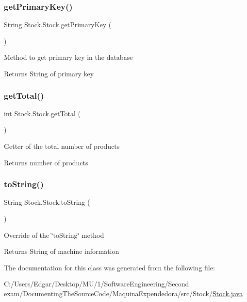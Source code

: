 \subsubsection{\texorpdfstring{get\+Primary\+Key()}{getPrimaryKey()}}
{\footnotesize\ttfamily String Stock.\+Stock.\+get\+Primary\+Key (\begin{DoxyParamCaption}{ }\end{DoxyParamCaption})\hspace{0.3cm}{\ttfamily [inline]}}

Method to get primary key in the database

\begin{DoxyReturn}{Returns}
String of primary key 
\end{DoxyReturn}
\mbox{\label{class_stock_1_1_stock_ad8b5a5604a4421296ab62e8e54817fdd}} 
\subsubsection{\texorpdfstring{get\+Total()}{getTotal()}}
{\footnotesize\ttfamily int Stock.\+Stock.\+get\+Total (\begin{DoxyParamCaption}{ }\end{DoxyParamCaption})\hspace{0.3cm}{\ttfamily [inline]}}

Getter of the total number of products

\begin{DoxyReturn}{Returns}
number of products 
\end{DoxyReturn}
\mbox{\label{class_stock_1_1_stock_a19aa572f66461240db89edf002bec36e}} 
\subsubsection{\texorpdfstring{to\+String()}{toString()}}
{\footnotesize\ttfamily String Stock.\+Stock.\+to\+String (\begin{DoxyParamCaption}{ }\end{DoxyParamCaption})\hspace{0.3cm}{\ttfamily [inline]}}

Override of the \char`\"{}to\+String\char`\"{} method \begin{DoxyReturn}{Returns}
String of machine information 
\end{DoxyReturn}


The documentation for this class was generated from the following file\+:\begin{DoxyCompactItemize}
\item 
C\+:/\+Users/\+Edgar/\+Desktop/\+M\+U/1/\+Software\+Engineering/\+Second exam/\+Documenting\+The\+Source\+Code/\+Maquina\+Expendedora/src/\+Stock/\mbox{\hyperlink{_stock_8java}{Stock.\+java}}\end{DoxyCompactItemize}
